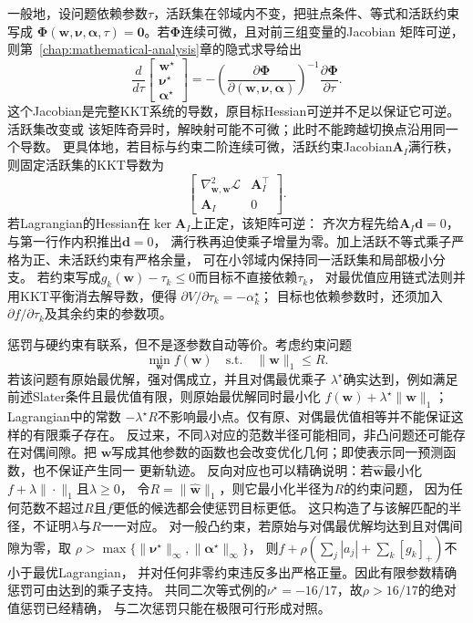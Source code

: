 一般地，设问题依赖参数$\tau$，活跃集在邻域内不变，把驻点条件、等式和活跃约束写成
$\bm{\Phi}(\bm{w},\bm{\nu},\bm{\alpha},\tau)=\bm{0}$。若$\bm\Phi$连续可微，且对前三组变量的Jacobian
矩阵可逆，则第~\ref{chap:mathematical-analysis}章的隐式求导给出
\[
  \frac{d}{d\tau}
  \begin{bmatrix}\bm{w}^{\star}\\\bm{\nu}^{\star}\\\bm{\alpha}^{\star}\end{bmatrix}
  =
  -\left(\frac{\partial\bm{\Phi}}
  {\partial(\bm{w},\bm{\nu},\bm{\alpha})}\right)^{-1}
  \frac{\partial\bm{\Phi}}{\partial\tau}.
\]
这个Jacobian是完整KKT系统的导数，原目标Hessian可逆并不足以保证它可逆。活跃集改变或
该矩阵奇异时，解映射可能不可微；此时不能跨越切换点沿用同一个导数。
更具体地，若目标与约束二阶连续可微，活跃约束Jacobian$\bm A_I$满行秩，
则固定活跃集的KKT导数为
\[
 \begin{bmatrix}
 \nabla_{\bm w,\bm w}^2\mathcal L&\bm A_I^\top\\
 \bm A_I&0
 \end{bmatrix}.
\]
若Lagrangian的Hessian在$\ker\bm A_I$上正定，该矩阵可逆：
齐次方程先给$\bm A_I\bm d=0$，与第一行作内积推出$\bm d=0$，
满行秩再迫使乘子增量为零。加上活跃不等式乘子严格为正、未活跃约束有严格余量，
可在小邻域内保持同一活跃集和局部极小分支。
若约束写成$g_k(\bm w)-\tau_k\leq0$而目标不直接依赖$\tau_k$，
对最优值应用链式法则并用KKT平衡消去解导数，便得
$\partial V/\partial\tau_k=-\alpha_k^\star$；
目标也依赖参数时，还须加入$\partial f/\partial\tau_k$及其余约束的参数项。

惩罚与硬约束有联系，但不是逐参数自动等价。考虑约束问题
\[
  \min_{\bm{w}}f(\bm{w})
  \quad\text{s.t.}\quad
  \lVert\bm{w}\rVert_1\leq R.
\]
若该问题有原始最优解，强对偶成立，并且对偶最优乘子
$\lambda^\star$确实达到，例如满足前述Slater条件且最优值有限，则原始最优解同时最小化
$f(\bm{w})+\lambda^\star\lVert\bm{w}\rVert_1$；Lagrangian中的常数
$-\lambda^\star R$不影响最小点。仅有原、对偶最优值相等并不能保证这样的有限乘子存在。
反过来，不同$\lambda$对应的范数半径可能相同，非凸问题还可能存在对偶间隙。把
$\bm{w}$写成其他参数的函数也会改变优化几何；即使表示同一预测函数，也不保证产生同一
更新轨迹。
反向对应也可以精确说明：若$\widehat{\bm w}$最小化$f+\lambda\|\cdot\|_1$且$\lambda\geq0$，
令$R=\|\widehat{\bm w}\|_1$，则它最小化半径为$R$的约束问题，
因为任何范数不超过$R$且$f$更低的候选都会使惩罚目标更低。
这只构造了与该解匹配的半径，不证明$\lambda$与$R$一一对应。
对一般凸约束，若原始与对偶最优解均达到且对偶间隙为零，取
$\rho>\max\{\|\bm\nu^\star\|_\infty,\|\bm\alpha^\star\|_\infty\}$，
则$f+\rho(\sum_j|a_j|+\sum_k[g_k]_+)$不小于最优Lagrangian，
并对任何非零约束违反多出严格正量。因此有限参数精确惩罚可由达到的乘子支持。
共同二次等式例的$\nu^\star=-16/17$，故$\rho>16/17$的绝对值惩罚已经精确，
与二次惩罚只能在极限可行形成对照。

